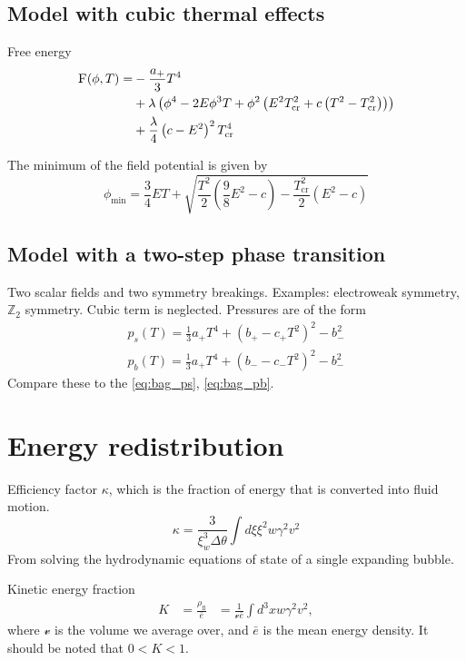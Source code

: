 \subsection{Model with cubic thermal effects}
Free energy
\cite[eq. 45]{giese_2020}
\begin{align}
\begin{split}
\textsc{F}(\phi, T) =
&- \frac{a_+}{3} T^4 \\
&+ \lambda \left( \phi^4 - 2E\phi^3 T + \phi^2 \left( E^2 T_\text{cr}^2 + c \left( T^2 - T_\text{cr}^2 \right) \right) \right) \\
&+ \frac{\lambda}{4} \left( c - E^2 \right)^2 T_\text{cr}^4
\end{split}
\end{align}

The minimum of the field potential is given by
\cite[eq. 46]{giese_2020}
\begin{equation}
\phi_\text{min} = \frac{3}{4} ET + \sqrt{\frac{T^2}{2}(\frac{9}{8}E^2 - c) - \frac{T_\text{cr}^2}{2} (E^2 - c)}
\end{equation}


\subsection{Model with a two-step phase transition}
Two scalar fields and two symmetry breakings. Examples: electroweak symmetry, $\mathbb{Z}_2$ symmetry.
Cubic term is neglected.
Pressures are of the form
\cite[eq. 47-48]{giese_2020}
\begin{align}
p_s(T) = \frac{1}{3}a_+ T^4 + (b_+ - c_+ T^2)^2 - b_-^2 \\
p_b(T) = \frac{1}{3}a_+ T^4 + (b_- - c_-T^2)^2 - b_-^2
\end{align}
Compare these to the \eqref{eq:bag_ps}, \eqref{eq:bag_pb}.


\section{Energy redistribution}
Efficiency factor $\kappa$, which is the fraction of energy that is converted into fluid motion.
\begin{equation}
\kappa = \frac{3}{\xi_w^3 \Delta \theta} \int d\xi \xi^2 w \gamma^2 v^2
\end{equation}
From solving the hydrodynamic equations of state of a single expanding bubble.

Kinetic energy fraction
\cites[eq. 7.36]{lecture_notes}[eq. 5]{giese_2020}
\begin{align}
K
&= \frac{\rho_\text{fl}}{\bar{e}}
&= \frac{1}{\mathcal{v} \bar{e}} \int d^3 x w \gamma^2 v^2,
\end{align}
where $\mathcal{v}$ is the volume we average over, and $\bar{e}$ is the mean energy density.
It should be noted that $0 < K < 1$.
\cite{giese_2020}

